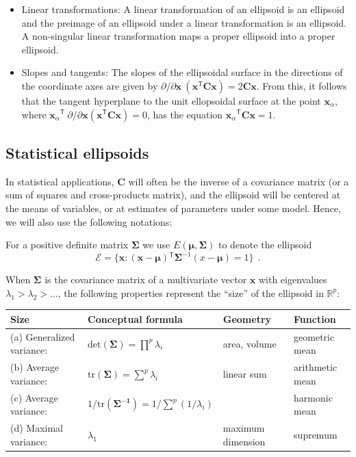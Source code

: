 \documentclass[11pt]{article}%
\renewcommand*{\vec}[1]{\ensuremath{\bm{#1}}}
\newcommand{\trans}{\ensuremath{^\mathsf{T}}}
\newcommand*{\mat}[1]{\ensuremath{\bm{#1}}}
\renewcommand*{\det}[1]{\ensuremath{\mathrm{det} (#1)}}
\newcommand*{\trace}[1]{\ensuremath{\mathrm{tr} (\mat{#1})}}
\newcommand*{\inv}[1]{\ensuremath{\mat{#1}^{-1}}}
\newcommand*{\period}{\:\: .}
\newcommand*{\Real}[1]{\mathbb{R}^{#1}}
\begin{document}
\begin{itemize}
 \item Linear transformations: A linear transformation of an ellipsoid is an ellipsoid and the preimage of an ellipsoid under a linear transformation is an ellipsoid.  A non-singular linear transformation maps a proper ellipsoid into a proper ellipsoid. 

 \item Slopes and tangents: The slopes of the ellipsoidal surface in the directions of the coordinate
 axes are given by $\partial / \partial \vec{x} \: (\vec{x}\trans \mat{C} \vec{x}) = 2 \mat{C} \vec{x}$.
 From this, it follows that the tangent hyperplane to the unit ellopsoidal surface at the point
 $\vec{x}_\alpha$, where $\vec{x}_\alpha\trans \: \partial / \partial \vec{x} (\vec{x}\trans \mat{C} \vec{x}) = 0$,
 has the equation $\vec{x}_\alpha \trans \mat{C} \vec{x} = 1$.
\end{itemize}

\subsection{Statistical ellipsoids}
 
In statistical applications, $\mat{C}$ will often be the inverse of a covariance
matrix (or a sum of squares and cross-products matrix), and the ellipsoid will
be centered at the means of variables, or at estimates of parameters under some model.
Hence, we will also use the following notations:

For a positive definite matrix 
$\mat{\Sigma}$ we use $E(\vec{\mu},\mat{\Sigma})$ to denote the ellipsoid 
\begin{equation}\label{eq:ellipsoid3}
\mathcal{E} = \{ \vec{x} : (\vec{x}-\vec{\mu})\trans \inv{\Sigma} (x-\vec{\mu}) = 1 \} \period
 \end{equation} 

When $\mat{\Sigma}$ is the covariance matrix of a multivariate vector $\vec{x}$ with eigenvalues
$\lambda_1 > \lambda_2 > \dots$,
the following
properties represent the ``size'' of the ellipsoid in $\Real{p}$:

\begin{tabular}{llll}
    Size                   &  Conceptual formula                    & Geometry       & Function \\
\hline
(a) Generalized variance:  & $\det{\mat{\Sigma}} = \prod^p \lambda_i$ & area, volume & geometric mean\\
(b) Average variance:        & $\trace{\mat{\Sigma}} = \sum^p \lambda_i $ & linear sum & arithmetic mean\\
(c) Average variance:        & $1/ \trace{\mat{\Sigma}^{-1}} = 1/\sum^p (1/\lambda_i) $ &  & harmonic mean\\
(d) Maximal variance:      & $\lambda_1$ & maximum dimension & supremum
 \end{tabular}
\medskip
\end{document}

